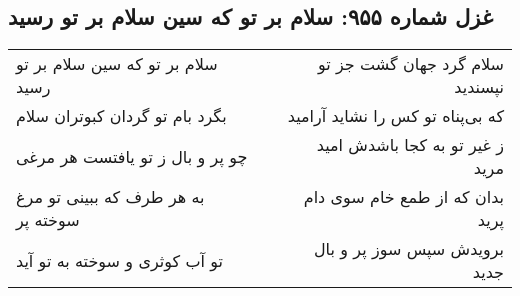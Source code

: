 \begin{center}
\section*{غزل شماره ۹۵۵: سلام بر تو که سین سلام بر تو رسید}
\label{sec:0955}
\begin{longtable}{l p{0.5cm} r}
سلام بر تو که سین سلام بر تو رسید
&&
سلام گرد جهان گشت جز تو نپسندید
\\
بگرد بام تو گردان کبوتران سلام
&&
که بی‌پناه تو کس را نشاید آرامید
\\
چو پر و بال ز تو یافتست هر مرغی
&&
ز غیر تو به کجا باشدش امید مرید
\\
به هر طرف که ببینی تو مرغ سوخته پر
&&
بدان که از طمع خام سوی دام پرید
\\
تو آب کوثری و سوخته به تو آید
&&
برویدش سپس سوز پر و بال جدید
\\
\end{longtable}
\end{center}

